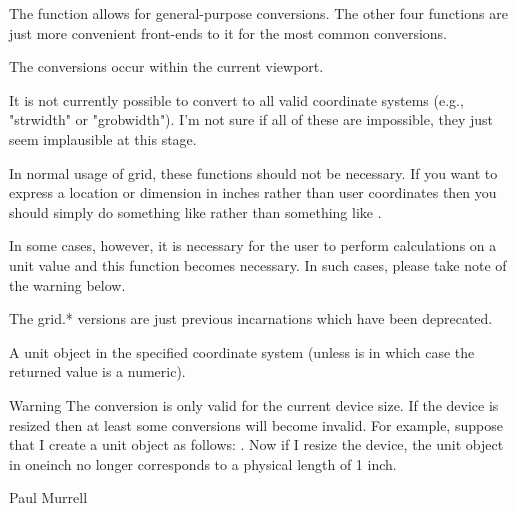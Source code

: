 %
\begin{Details}\relax
The  function allows for general-purpose
conversions.  The other four functions are just more convenient
front-ends to it for the most common conversions.

The conversions occur within the current viewport.

It is not currently possible to convert to all valid coordinate systems
(e.g., "strwidth" or "grobwidth").  I'm not sure if all of these
are impossible, they just seem implausible at this stage.

In normal usage of grid, these functions should not be necessary.
If you want to express a location or dimension in inches rather
than user coordinates then you should simply do something like
 rather than something like
.

In some cases, however, it is necessary for the user to
perform calculations on a unit value and this function becomes
necessary.  In such cases, please take note of the warning below.

The grid.* versions are just previous incarnations which have
been deprecated.
\end{Details}
%
\begin{Value}
A unit object in the specified coordinate system
(unless  is  in which case
the returned value is a numeric).
\end{Value}
%
\begin{Section}{Warning}
The conversion is only valid for the current device size.
If the device is resized then at least some conversions will
become invalid.  For example, suppose that I create a unit
object as follows: .  Now if I resize the device, the unit object in
oneinch no longer corresponds to a physical length of 1 inch.

\end{Section}
%
\begin{Author}\relax
 Paul Murrell 
\end{Author}
%
\begin{SeeAlso}\relax
\end{SeeAlso}
%
